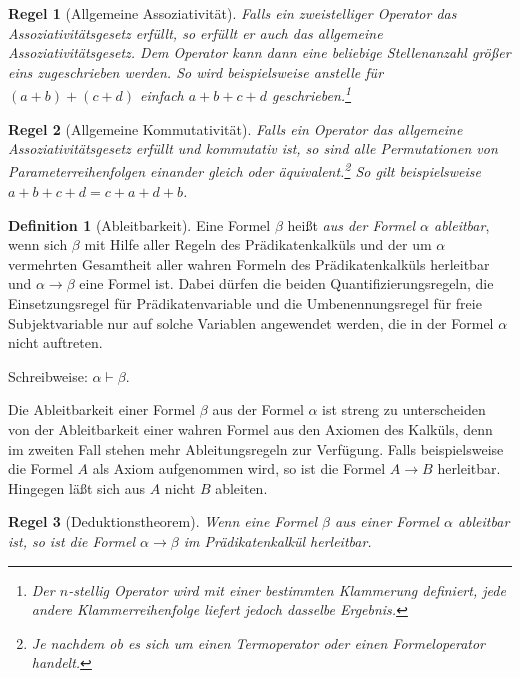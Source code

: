 \documentclass[a4paper,german,10pt,twoside]{book}
\newtheorem{rul}{Regel}
\theoremstyle{definition}
\newtheorem{defn}[thm]{Definition}
\theoremstyle{remark}
\begin{document}
\begin{rul}[Allgemeine Assoziativit{\"a}t]
Falls ein zweistelliger Operator das Assoziativit{\"a}tsgesetz erf{\"u}llt, so erf{\"u}llt er auch das
allgemeine Assoziativit{\"a}tsgesetz. Dem Operator kann dann eine beliebige Stellenanzahl gr{\"o}{\ss}er eins
zugeschrieben werden. So wird beispielsweise anstelle f{\"u}r $(a + b) + (c + d)$ einfach $a + b + c +
d$ geschrieben.\footnote{Der $n$-stellig Operator wird mit einer bestimmten Klammerung definiert,
jede andere Klammerreihenfolge liefert jedoch dasselbe Ergebnis.}
\end{rul}

\begin{rul}[Allgemeine Kommutativit{\"a}t]
Falls ein Operator das allgemeine Assoziativit{\"a}tsgesetz erf{\"u}llt und kommutativ ist, so sind alle
Permutationen von Parameterreihenfolgen einander gleich oder {\"a}quivalent.\footnote{Je nachdem ob es
sich um einen Termoperator oder einen Formeloperator handelt.} So gilt beispielsweise $a + b + c +
d  = c + a + d + b$.
\end{rul}

\begin{defn}[Ableitbarkeit]
Eine Formel $\beta$ hei{\ss}t \emph{aus der Formel $\alpha$ ableitbar}, wenn sich $\beta$ mit Hilfe
aller Regeln des Pr{\"a}dikatenkalk{\"u}ls und der um $\alpha$ vermehrten Gesamtheit aller wahren Formeln
des Pr{\"a}dikatenkalk{\"u}ls herleitbar und $\alpha \rightarrow \beta$ eine Formel ist. Dabei d{\"u}rfen die beiden
Quantifizierungsregeln, die Einsetzungsregel f{\"u}r Pr{\"a}dikatenvariable und die Umbenennungsregel f{\"u}r
freie Subjektvariable nur auf solche Variablen angewendet werden, die in der Formel $\alpha$ nicht
auftreten.
\par
Schreibweise: $\alpha \vdash \beta$.
\end{defn}
Die Ableitbarkeit einer Formel $\beta$ aus der Formel $\alpha$ ist streng zu unterscheiden von der
Ableitbarkeit einer wahren Formel aus den Axiomen des Kalk{\"u}ls, denn im zweiten Fall stehen mehr
Ableitungsregeln zur Verf{\"u}gung. Falls beispielsweise die Formel $A$ als Axiom aufgenommen wird, so
ist die Formel $A \rightarrow B$ herleitbar. Hingegen l{\"a}{\ss}t sich aus $A$ nicht $B$ ableiten.

\begin{rul}[Deduktionstheorem]
Wenn eine Formel $\beta$ aus einer Formel $\alpha$ ableitbar ist, so ist die Formel $\alpha \rightarrow
\beta$ im Pr{\"a}dikatenkalk{\"u}l herleitbar.
\end{rul}
\end{document}
